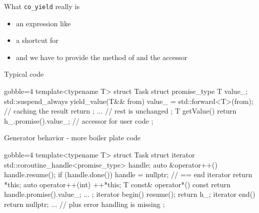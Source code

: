 \begin{frame}[fragile]
  \begin{block}{What \texttt{co\_yield} really is}
    \begin{itemize}
    \item an expression like 
    \item a shortcut for 
    \item and we have to provide the  method of  and the  accessor
    \end{itemize}
  \end{block}
  \begin{exampleblock}{Typical code}
    {\scriptsize
      \begin{cppcode*}{gobble=4}
        template<typename T> struct Task {
          struct promise_type {
            T value_;
            std::suspend_always yield_value(T&& from) {
              value_ = std::forward<T>(from); // caching the result
              return {};
            }
            ... // rest is unchanged
          };
          T getValue() { return h_.promise().value_; } // accessor for user code
        };
      \end{cppcode*}
    }
  \end{exampleblock}
\end{frame}

\begin{frame}[fragile]
  \begin{block}{Generator behavior - more boiler plate code}
    {\scriptsize
      \begin{cppcode*}{gobble=4}
        template<typename T>
        struct Task {
          struct iterator {
            std::coroutine_handle<promise_type> handle;
            auto &operator++() {
              handle.resume();
              if (handle.done()) { handle = nullptr; } // == end iterator
              return *this;
            }
            auto operator++(int) { ++*this; }
            T const& operator*() const { return handle.promise().value_; }
            ...
          };
          iterator begin() { resume(); return {h_}; }
          iterator end() { return {nullptr}; }
          ... // plus error handling is missing
        };
      \end{cppcode*}
    }
  \end{block}
\end{frame}

